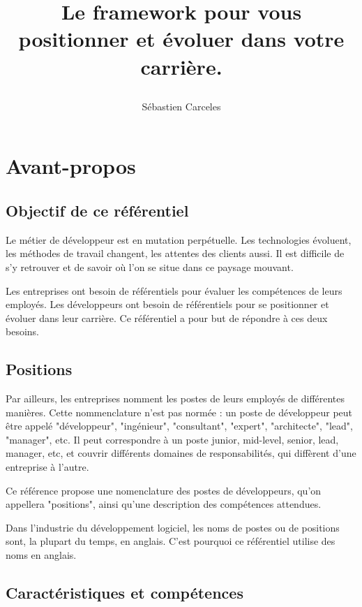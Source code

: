 \documentclass[a4paper, french, openany, 12pt]{book}
\title{
  \vspace*{-8cm}

  \fullwidthimage{images/cover.jpg}

  \vspace*{5cm}

  \bsc{Référenciel de compétences pour développeurs et développeuses}

  Le framework pour vous positionner et évoluer dans votre carrière.
}
\author{Sébastien Carceles}
\date{}
\begin{document}
\begin{titlepage}
  \maketitle
\end{titlepage}

\frontmatter

\chapter{Avant-propos}

\section*{Objectif de ce référentiel}

Le métier de développeur est en mutation perpétuelle.
Les technologies évoluent, les méthodes de travail changent, les attentes des clients aussi.
Il est difficile de s'y retrouver et de savoir où l'on se situe dans ce paysage mouvant.

Les entreprises ont besoin de référentiels pour évaluer les compétences de leurs employés.
Les développeurs ont besoin de référentiels pour se positionner et évoluer dans leur carrière.
Ce référentiel a pour but de répondre à ces deux besoins.

\section*{Positions}

Par ailleurs, les entreprises nomment les postes de leurs employés de différentes manières.
Cette nommenclature n'est pas normée : un poste de développeur peut être appelé "développeur", "ingénieur", 
"consultant", "expert", "architecte", "lead", "manager", etc.
Il peut correspondre à un poste junior, mid-level, senior, lead, manager, etc, et couvrir différents domaines de 
responsabilités, qui diffèrent d'une entreprise à l'autre.

Ce référence propose une nomenclature des postes de développeurs, qu'on appellera "positions",
ainsi qu'une description des compétences attendues.

Dans l'industrie du développement logiciel, les noms de postes ou de positions sont, la plupart du temps, en anglais.
C'est pourquoi ce référentiel utilise des noms en anglais.

\section*{Caractéristiques et compétences}
\end{document}
